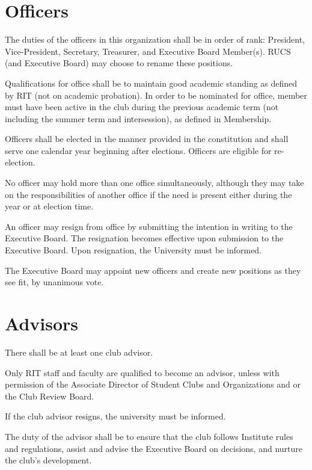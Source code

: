 \documentclass[a4paper]{article}
\begin{document}
\section{Officers}
\begin{subroutines}
\item The duties of the officers in this organization shall be in order of rank: President, Vice-President, Secretary, Treasurer, and Executive Board Member(s). RUCS (and Executive Board) may choose to rename these positions.
\item Qualifications for office shall be to maintain good academic standing as defined by RIT (not on academic probation). In order to be nominated for office, member must have been active in the club during the previous academic term (not including the summer term and intersession), as defined in Membership.
\item Officers shall be elected in the manner provided in the constitution and shall serve one calendar year beginning after elections. Officers are eligible for re-election.
\item No officer may hold more than one office simultaneously, although they may take on the responsibilities of another office if the need is present either during the year or at election time.
\item An officer may resign from office by submitting the intention in writing to the Executive Board. The resignation becomes effective upon submission to the Executive Board. Upon resignation, the University must be informed.
\item The Executive Board may appoint new officers and create new positions as they see fit, by unanimous vote.
\end{subroutines}

\section{Advisors}
\begin{subroutines}
\item There shall be at least one club advisor.
\item Only RIT staff and faculty are qualified to become an advisor, unless with permission of the Associate Director of Student Clubs and Organizations and or the Club Review Board.
\item If the club advisor resigns, the university must be informed.
\item The duty of the advisor shall be to ensure that the club follows Institute rules and regulations, assist and advise the Executive Board on decisions, and nurture the club's development.
\end{subroutines}
\end{document}
